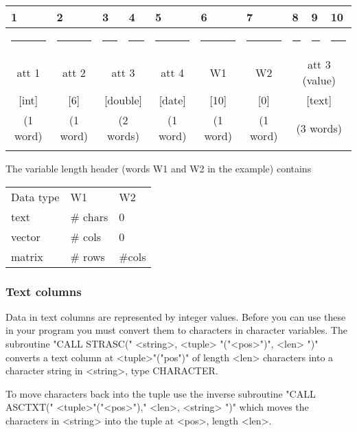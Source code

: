 \smallskip
{\centering\small{}
 \def\strut{\rule{0pt}{2pt}} \def\Strut{\rule{0pt}{12pt}}
 \def\fl{\multicolumn{1}{|l|}}
\begin{tabular}{|c|c|c|c|c|c|c|c|c|c|}
 \fl{1}&\fl{2}&\fl{3}&\fl{4}&\fl{5}&\fl{6}&\fl{7}&\fl{8}&\fl{9}&\fl{10}\\
 \hline
   \rule{25pt}{0pt}&
   \rule{25pt}{0pt}&
   \rule{25pt}{0pt}&
   \rule{25pt}{0pt}&
   \rule{25pt}{0pt}&
   \rule{25pt}{0pt}&
   \rule{25pt}{0pt}&
   \rule{25pt}{0pt}&
   \rule{25pt}{0pt}&
   \rule{25pt}{0pt}\\
 \Strut att 1&
 att 2&
 \multicolumn{2}{|c|}{att 3}&
 att 4&
  W1 &
  W2 &
  \multicolumn{3}{|c|}{att 3 (value)}\\
 \Strut [int]&
 [6]&
 \multicolumn{2}{|c|}{[double]}&
 [date]&
   [10]&
   [0]&
   \multicolumn{3}{|c|}{[text]}\\
 \Strut (1 word)&
 (1 word)&
 \multicolumn{2}{|c|}{(2 words)}&
 (1 word)&
  (1 word)&
  (1 word)&
  \multicolumn{3}{|c|}{(3 words)}\\
  &&&&&&&&&\\
 \hline
\end{tabular}
\par}
 
\medskip
The variable length header (words W1 and W2 in the example) contains
 
{\centering
\begin{tabular}{lll}
Data type& W1& W2\\
\noalign{\medskip}
text& \# chars& 0\\
vector&\# cols& 0\\
matrix& \# rows& \#cols
\end{tabular}}
 
 
\medskip
 
\subsubsection{Text columns}
%
Data in text columns are represented by integer values.
Before you can use these in your program you must convert them
to characters in character variables.
The subroutine
\<"CALL STRASC(" <string>, <tuple> "("<pos>")", <len> ")"\>
converts a text column at <tuple>"("pos")" of length <len> characters
into a character string in <string>, type CHARACTER.
 
To move characters back into the tuple use the inverse subroutine
\<"CALL ASCTXT(" <tuple>"("<pos>")," <len>, <string> ")"\>
which moves the characters in <string> into the tuple at <pos>,
length <len>.
 
